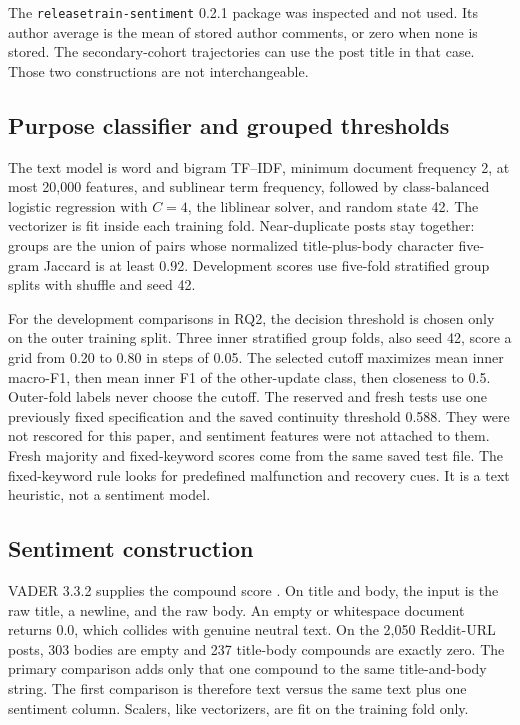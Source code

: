 \documentclass[conference,letterpaper]{IEEEtran}
\begin{document}
The \texttt{releasetrain-sentiment} 0.2.1 package was inspected and not used. Its author average is the mean of stored author comments, or zero when none is stored. The secondary-cohort trajectories can use the post title in that case. Those two constructions are not interchangeable.

\subsection{Purpose classifier and grouped thresholds}
The text model is word and bigram TF--IDF, minimum document frequency 2, at most 20,000 features, and sublinear term frequency, followed by class-balanced logistic regression with $C=4$, the liblinear solver, and random state 42. The vectorizer is fit inside each training fold. Near-duplicate posts stay together: groups are the union of pairs whose normalized title-plus-body character five-gram Jaccard is at least 0.92. Development scores use five-fold stratified group splits with shuffle and seed 42.

For the development comparisons in RQ2, the decision threshold is chosen only on the outer training split. Three inner stratified group folds, also seed 42, score a grid from 0.20 to 0.80 in steps of 0.05. The selected cutoff maximizes mean inner macro-F1, then mean inner F1 of the other-update class, then closeness to 0.5. Outer-fold labels never choose the cutoff. The reserved and fresh tests use one previously fixed specification and the saved continuity threshold 0.588. They were not rescored for this paper, and sentiment features were not attached to them. Fresh majority and fixed-keyword scores come from the same saved test file. The fixed-keyword rule looks for predefined malfunction and recovery cues. It is a text heuristic, not a sentiment model.

\subsection{Sentiment construction}
VADER 3.3.2 supplies the compound score \cite{Hutto2014VADER}. On title and body, the input is the raw title, a newline, and the raw body. An empty or whitespace document returns 0.0, which collides with genuine neutral text. On the 2,050 Reddit-URL posts, 303 bodies are empty and 237 title-body compounds are exactly zero. The primary comparison adds only that one compound to the same title-and-body string. The first comparison is therefore text versus the same text plus one sentiment column. Scalers, like vectorizers, are fit on the training fold only.
\end{document}
